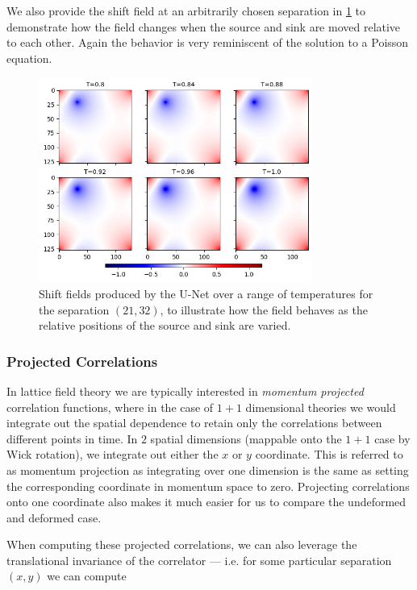\documentclass[12pt]{article}
\begin{document}
We also provide the shift field at an arbitrarily chosen separation in \ref{fig:unet_alt_shifts} to demonstrate how the field changes when the source and sink
are moved relative to each other. Again the behavior is very reminiscent of the solution to a Poisson equation.

\begin{figure}
	\centering
	\includegraphics[width=0.8\textwidth]{figures/unet_alt_shifts.png}
	\caption[U-Net Alternate Shifts]{Shift fields produced by the U-Net over a range of temperatures for the separation $(21, 32)$, to illustrate how the field
	behaves as the relative positions of the source and sink are varied.}
	\label{fig:unet_alt_shifts}
\end{figure}

\subsubsection{Projected Correlations}

In lattice field theory we are typically interested in \textit{momentum projected} correlation functions, where in the case of $1+1$ dimensional theories we would
integrate out the spatial dependence to retain only the correlations between different points in time. In $2$ spatial dimensions (mappable onto the $1+1$ case by Wick rotation), 
we integrate out either the $x$ or $y$ coordinate. This is referred to as momentum projection as integrating over one dimension is the same as setting the
corresponding coordinate in momentum space to zero. Projecting correlations onto one coordinate also makes it much easier for us to compare the undeformed
and deformed case. 

When computing these projected correlations, we can also leverage the translational invariance of the correlator --- i.e. for some particular separation $(x, y)$ we can
compute 
\end{document}
